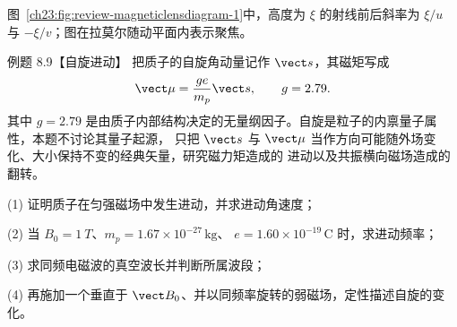 \begin{xesolution}
图~\ref{ch23:fig:review-magneticlensdiagram-1}中，高度为 $\xi$ 的射线前后斜率为 $\xi/u$ 与 $-\xi/v$；图在拉莫尔随动平面内表示聚焦。
\par\noindent\begin{minipage}{\linewidth}
\magneticLensDiagram
{}\label{ch23:fig:review-magneticlensdiagram-1}
\end{minipage}\par\medskip
\end{xesolution}

\begin{origexamplebox}{例题 8.9【自旋进动】}
把质子的自旋角动量记作 $\vect s$，其磁矩写成
\[
  \vect\mu=\frac{ge}{m_p}\vect s,
  \qquad g=2.79.
\]
其中 $g=2.79$ 是由质子内部结构决定的无量纲因子。自旋是粒子的内禀量子属性，本题不讨论其量子起源，
只把 $\vect s$ 与 $\vect\mu$ 当作方向可能随外场变化、大小保持不变的经典矢量，研究磁力矩造成的
进动以及共振横向磁场造成的翻转。

(1) 证明质子在匀强磁场中发生进动，并求进动角速度；

(2) 当 $B_0=\SI{1}{T}$、$m_p=1.67\times10^{-27}\,\mathrm{kg}$、
$e=1.60\times10^{-19}\,\mathrm C$ 时，求进动频率；

(3) 求同频电磁波的真空波长并判断所属波段；

(4) 再施加一个垂直于 $\vect B_0$、并以同频率旋转的弱磁场，定性描述自旋的变化。
\end{origexamplebox}

